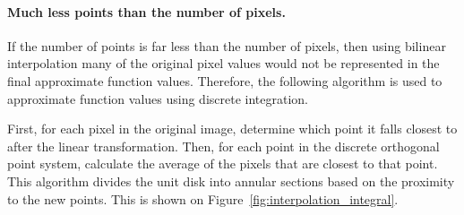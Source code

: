 \paragraph{Much less points than the number of pixels.}
If the number of points is far less than the number of pixels, then using bilinear interpolation many of the original pixel values would not be represented in the final approximate function values. Therefore, the following algorithm is used to approximate function values using discrete integration.

First, for each pixel in the original image, determine which point it falls closest to after the linear transformation. Then, for each point in the discrete orthogonal point system, calculate the average of the pixels that are closest to that point. This algorithm divides the unit disk into annular sections based on the proximity to the new points. This is shown on Figure~\ref{fig:interpolation_integral}.

